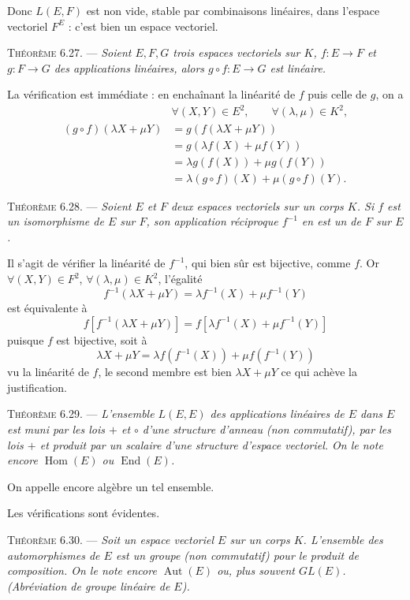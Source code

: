 Donc $L(E,F)$ est non vide, stable par combinaisons linéaires, dans l'espace vectoriel $F^E$ : c'est bien un espace vectoriel. \bookend

\medskip\noindent\textsc{Théorème 6.27.} --- \emph{Soient $E,F,G$ trois espaces vectoriels sur $K$, $f:E\longrightarrow F$ et $g:F\longrightarrow G$ des applications linéaires, alors $g\circ f:E\longrightarrow G$ est linéaire.}

La vérification est immédiate : en enchaînant la linéarité de $f$ puis celle de $g$, on a
\begin{align*}
&\forall(X,Y)\in E^2,\qquad\forall(\lambda,\mu)\in K^2,\\
(g\circ f)(\lambda X+\mu Y)&=g(f(\lambda X+\mu Y))\\
&=g(\lambda f(X)+\mu f(Y))\\
&=\lambda g(f(X))+\mu g(f(Y))\\
&=\lambda(g\circ f)(X)+\mu(g\circ f)(Y).
\end{align*}
\bookend

\medskip\noindent\textsc{Théorème 6.28.} --- \emph{Soient $E$ et $F$ deux espaces vectoriels sur un corps $K$. Si $f$ est un isomorphisme de $E$ sur $F$, son application réciproque $f^{-1}$ en est un de $F$ sur $E$.}

Il s'agit de vérifier la linéarité de $f^{-1}$, qui bien sûr est bijective, comme $f$. Or $\forall(X,Y)\in F^2$, $\forall(\lambda,\mu)\in K^2$, l'égalité
\[
f^{-1}(\lambda X+\mu Y)=\lambda f^{-1}(X)+\mu f^{-1}(Y)
\]
est équivalente à
\[
f[f^{-1}(\lambda X+\mu Y)]=f[\lambda f^{-1}(X)+\mu f^{-1}(Y)]
\]
puisque $f$ est bijective, soit à
\[
\lambda X+\mu Y=\lambda f(f^{-1}(X))+\mu f(f^{-1}(Y))
\]
vu la linéarité de $f$, le second membre est bien $\lambda X+\mu Y$ ce qui achève la justification. \bookend

\medskip\noindent\textsc{Théorème 6.29.} --- \emph{L'ensemble $L(E,E)$ des applications linéaires de $E$ dans $E$ est muni par les lois $+$ et $\circ$ d'une structure d'anneau (non commutatif), par les lois $+$ et produit par un scalaire d'une structure d'espace vectoriel. On le note encore $\operatorname{Hom}(E)$ ou $\operatorname{End}(E)$.}

On appelle encore algèbre un tel ensemble.

Les vérifications sont évidentes. \bookend

\medskip\noindent\textsc{Théorème 6.30.} --- \emph{Soit un espace vectoriel $E$ sur un corps $K$. L'ensemble des automorphismes de $E$ est un groupe (non commutatif) pour le produit de composition. On le note encore $\operatorname{Aut}(E)$ ou, plus souvent $GL(E)$. (Abréviation de groupe linéaire de $E$).}

